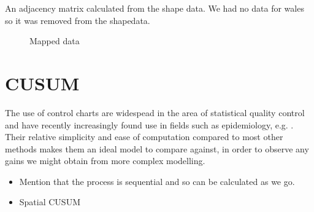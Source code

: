 \documentclass{report}
\begin{document}
 
 An adjacency matrix calculated from the shape data. We had no data for wales so it was removed from the shapedata.

\begin{figure}
\centering
{}
\caption{Mapped data}
\end{figure}

\chapter{CUSUM}

The use of control charts are widespead in the area of statistical quality control and have recently increasingly found use in fields such as epidemiology, e.g. . Their relative simplicity and ease of computation compared to most other methods makes them an ideal model to compare against, in order to observe any gains we might obtain from more complex modelling.

\begin{itemize}
\item Mention that the process is sequential and so can be calculated as we go.
\item Spatial CUSUM
\end{itemize}
\end{document}
